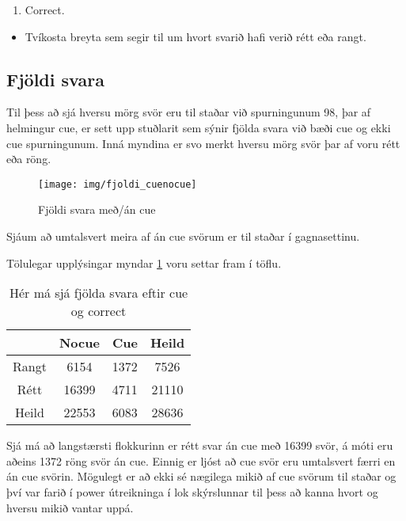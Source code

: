 \documentclass[
  10pt,
]{article}
\providecommand{\tightlist}{%
  \setlength{\itemsep}{0pt}\setlength{\parskip}{0pt}}
\begin{document}
\begin{enumerate}
\def\labelenumi{\arabic{enumi}.}
\setcounter{enumi}{4}
\tightlist
\item
  Correct.
\end{enumerate}

\begin{itemize}
\tightlist
\item
  Tvíkosta breyta sem segir til um hvort svarið hafi verið rétt eða rangt.
\end{itemize}

\newpage

\hypertarget{fjuxf6ldi-svara}{%
\subsection{Fjöldi svara}\label{fjuxf6ldi-svara}}

Til þess að sjá hversu mörg svör eru til staðar við spurningunum 98, þar af helmingur cue, er sett upp stuðlarit sem sýnir fjölda svara við bæði cue og ekki cue spurningunum. Inná myndina er svo merkt hversu mörg svör þar af voru rétt eða röng.

\begin{figure}[H]

{\centering \texttt{[image: img/fjoldi\_cuenocue]} 

}

\caption{Fjöldi svara með/án cue}\label{fig:mynd1}
\end{figure}

Sjáum að umtalsvert meira af án cue svörum er til staðar í gagnasettinu.

Tölulegar upplýsingar myndar \ref{fig:mynd1} voru settar fram í töflu.

\begin{table}[!h]

\caption{\label{tab:tafla1}\label{tab:strings} Hér má sjá fjölda svara eftir cue og correct }
\centering
\begin{tabular}[t]{cccc}
\toprule
\textbf{} & \textbf{Nocue} & \textbf{Cue} & \textbf{Heild}\\
\midrule
Rangt & 6154 & 1372 & 7526\\
Rétt & 16399 & 4711 & 21110\\
Heild & 22553 & 6083 & 28636\\
\bottomrule
\end{tabular}
\end{table}

Sjá má að langstærsti flokkurinn er rétt svar án cue með 16399 svör, á móti eru aðeins 1372 röng svör án cue. Einnig er ljóst að cue svör eru umtalsvert færri en án cue svörin. Mögulegt er að ekki sé nægilega mikið af cue svörum til staðar og því var farið í power útreikninga í lok skýrslunnar til þess að kanna hvort og hversu mikið vantar uppá.
\end{document}
